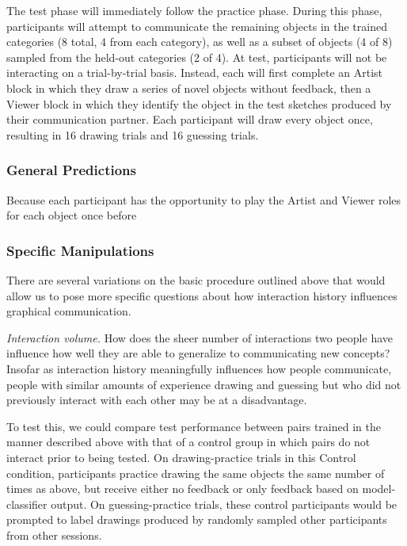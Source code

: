 \documentclass[12pt]{article}
\begin{document}
The test phase will immediately follow the practice phase. During this phase, participants will attempt to communicate the remaining objects in the trained categories (8 total, 4 from each category), as well as a subset of objects (4 of 8) sampled from the held-out categories (2 of 4). At test, participants will not be interacting on a trial-by-trial basis. Instead, each will first complete an Artist block in which they draw a series of novel objects without feedback, then a Viewer block in which they identify the object in the test sketches produced by their communication partner. Each participant will draw every object once, resulting in 16 drawing trials and 16 guessing trials. 

\subsubsection{General Predictions}

Because each participant has the opportunity to play the Artist and Viewer roles for each object once before 


\subsubsection{Specific Manipulations}

There are several variations on the basic procedure outlined above that would allow us to pose more specific questions about how interaction history influences graphical communication.

\emph{Interaction volume.} How does the sheer number of interactions two people have influence how well they are able to generalize to communicating new concepts? Insofar as interaction history meaningfully influences how people communicate, people with similar amounts of experience drawing and guessing but who did not previously interact with each other may be at a disadvantage. 

To test this, we could compare test performance between pairs trained in the manner described above with that of a control group in which pairs do not interact prior to being tested. On drawing-practice trials in this Control condition, participants practice drawing the same objects the same number of times as above, but receive either no feedback or only feedback based on model-classifier output. On guessing-practice trials, these control participants would be prompted to label drawings produced by randomly sampled other participants from other sessions. 
\medskip
\end{document}
